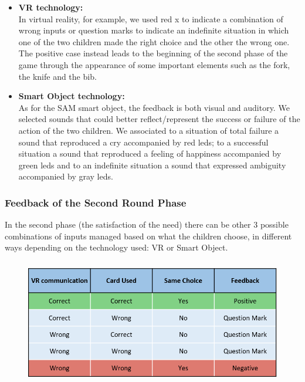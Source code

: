 \documentclass [12pt]{article}
\begin{document}
\begin{itemize}[•]
\item \textbf{VR technology:}\\
In virtual reality, for example, we used red x to indicate a combination of wrong inputs or question marks to indicate an indefinite situation in which one of the two children made the right choice and the other the wrong one. The positive case instead leads to the beginning of the second phase of the game through the appearance of some important elements such as the fork, the knife and the bib.
\item \textbf{Smart Object technology:}\\
As for the SAM smart object, the feedback is both visual and auditory. We selected sounds that could better reflect/represent the success or failure of the action of the two children. We associated to a situation of total failure a sound that reproduced a cry accompanied by red leds; to a successful situation a sound that reproduced a feeling of happiness accompanied by green leds and to an indefinite situation a sound that expressed ambiguity accompanied by gray leds.
\end{itemize}


\clearpage
\subsubsection{Feedback of the Second Round Phase}
In the second phase (the satisfaction of the need) there can be other 3 possible combinations of inputs managed based on what the children choose, in different ways depending on the technology used: VR or Smart Object.

\begin{figure}[ht!]
\centering
\includegraphics[height=5.5cm,width=13cm]{Feedback2.png}
\end{figure}
\end{document}
